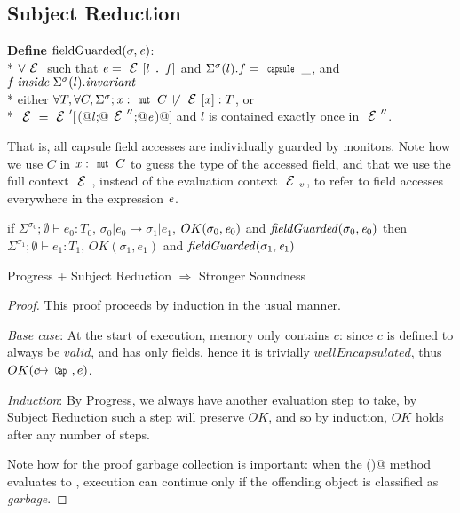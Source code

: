 \subsection{Subject Reduction}

\noindent\textbf{Define} $\text{fieldGuarded}(\sigma,\e)$:\\*
\indent$\forall \ctx$ such that $\e=\ctx[l\singleDot\f] $
and $\Sigma^\sigma(l).f=\Kw{capsule}\,\_$, and $\f\mathrel{\mathit{inside}} \Sigma^\sigma(l).\mathit{invariant}$\\*
\indent\indent either
$\forall T, \forall C, \Sigma^\sigma;\x:\Kw{mut}\,C\,\not\vdash\ctx[\x]:T$, or\\*
\indent\indent $\ctx=\ctx'[$\Q@M(@$l$\Q@;@$\ctx''$\Q@;@${\mathit{e}}$\Q@)@$]$ and $l$ is contained exactly once in $\ctx''$.

That is, all \Q@mut@ capsule field accesses are individually guarded by monitors.
Note how we use $C$ in $\x:\Kw{mut}\,C$ to guess the type of the accessed field,
and that we use the full context $\ctx$, instead of the evaluation context $\ctx_v$,
to refer to field accesses everywhere in the expression ${\mathit{e}}$.


\begin{theorem}
if $\Sigma^{\sigma_0};\emptyset\vdash e_0: T_0$,
$\sigma_0|e_0\rightarrow \sigma_1|e_1$,
$OK(\sigma_0,\e_0)$
and
$\mathit{fieldGuarded}(\sigma_0,\e_0)$
then
$\Sigma^{\sigma_1};\emptyset\vdash e_1: T_1$,
$OK(\sigma_1,e_1)$ and
$\mathit{fieldGuarded}(\sigma_1,\e_1)$
\end{theorem}

\begin{theorem}
	Progress + Subject Reduction $\Rightarrow$ Stronger Soundness
\end{theorem}
\begin{proof}
This proof proceeds by induction in the usual manner.

\emph{Base case}: At the start of execution, memory only contains $c$: since $c$ is defined to always be $\mathit{valid}$, and has only \Q@mut@ fields, hence it is trivially $\mathit{wellEncapsulated}$, thus $OK(c\mapsto\Kw{Cap},e)$.

\emph{Induction}: By Progress, we always have another evaluation step to take, by Subject Reduction such a step will preserve $\mathit{OK}$, and so by induction, $\mathit{OK}$ holds after any number of steps.

Note how for the proof garbage collection is important:
when the \Q@invariant()@ method evaluates to \Q@false@,
execution can continue only if the offending object is classified as \emph{garbage}.
\end{proof}

